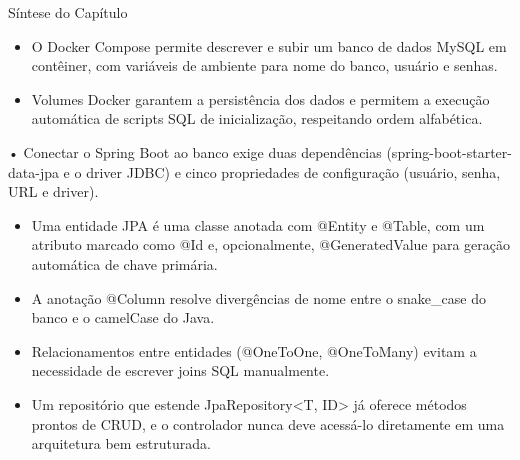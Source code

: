 Síntese do Capítulo

\begin{itemize}
  \item O Docker Compose permite descrever e subir um banco de dados MySQL em contêiner, com variáveis de ambiente para nome do banco, usuário e senhas.
\end{itemize}

\begin{itemize}
  \item Volumes Docker garantem a persistência dos dados e permitem a execução automática de scripts SQL de inicialização, respeitando ordem alfabética.
\end{itemize}

\begin{infobox}{• Conectar o Spring Boot ao banco exige duas dependências}
(spring-boot-starter-data-jpa e o driver JDBC) e cinco propriedades de configuração (usuário, senha, URL e driver).
\end{infobox}

\begin{itemize}
  \item Uma entidade JPA é uma classe anotada com @Entity e @Table, com um atributo marcado como @Id e, opcionalmente, @GeneratedValue para geração automática de chave primária.
\end{itemize}

\begin{itemize}
  \item A anotação @Column resolve divergências de nome entre o snake\_case do banco e o camelCase do Java.
\end{itemize}

\begin{itemize}
  \item Relacionamentos entre entidades (@OneToOne, @OneToMany) evitam a necessidade de escrever joins SQL manualmente.
\end{itemize}

\begin{itemize}
  \item Um repositório que estende JpaRepository<T, ID> já oferece métodos prontos de CRUD, e o controlador nunca deve acessá-lo diretamente em uma arquitetura bem estruturada.
\end{itemize}
